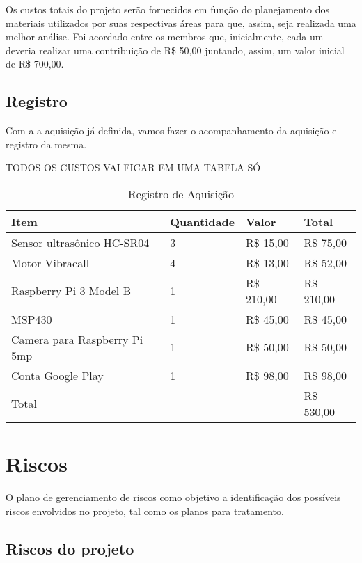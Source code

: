Os custos totais do projeto serão fornecidos em função do planejamento dos materiais utilizados por suas respectivas áreas para que, assim, seja realizada uma melhor análise. Foi acordado entre os membros que, inicialmente, cada um deveria realizar uma contribuição de R\$ 50,00 juntando, assim, um valor inicial de R\$ 700,00.

\subsection{Registro}

Com a a aquisição já definida, vamos fazer o acompanhamento da aquisição e registro da mesma.

TODOS OS CUSTOS VAI FICAR EM UMA TABELA SÓ

\begin{table}[ht]
    \centering
	\label{aqeletronica}
    \caption{Registro de Aquisição}
    \begin{tabular}{|p{2.0in}|p{0.8in}|p{0.7in}|p{1.0in}|}
        \hline
        Item & Quantidade & Valor & Total \\
        \hline
        Sensor ultrasônico HC-SR04 &  3 & R\$ 15,00 & R\$ 75,00 \\
        Motor Vibracall & 4 & R\$ 13,00 & R\$ 52,00 \\
        Raspberry Pi 3 Model B & 1 & R\$ 210,00 & R\$ 210,00 \\
        MSP430 & 1 & R\$ 45,00 & R\$ 45,00 \\
        Camera para Raspberry Pi 5mp & 1 & R\$ 50,00 & R\$ 50,00 \\
        Conta Google Play & 1 & R\$ 98,00 & R\$ 98,00 \\
        \hline
        Total & & & R\$ 530,00 \\
        \hline
    \end{tabular}
\end{table}

\section{Riscos}

O plano de gerenciamento de riscos como objetivo a identificação dos possíveis riscos envolvidos no projeto, tal como os planos para tratamento.


\subsection{Riscos do projeto }


